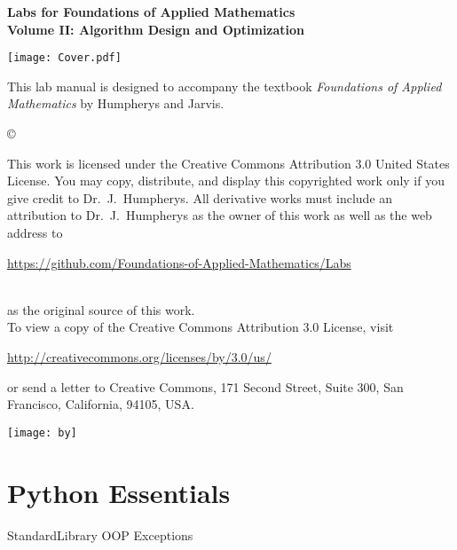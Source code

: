 \documentclass[nociteref]{SIAM-GH-book}
\begin{document}

\thispagestyle{empty} %

\begin{center}
{\huge \bf Labs for Foundations of Applied Mathematics} \\
\vspace{5mm}
{\Large \bf Volume II: Algorithm Design and Optimization}
\vspace{20mm}

\texttt{[image: Cover.pdf]}
\end{center}
\frontmatter



\begin{thepreface} %

This lab manual is designed to accompany the textbook \emph{Foundations of Applied Mathematics} by Humpherys and Jarvis.

\vfill
\copyright{This work is licensed under the Creative Commons Attribution 3.0 United States
License.  You may copy, distribute, and display this copyrighted work only if you give
credit to Dr.~J.~Humpherys. All derivative works must include an attribution to Dr.~J.~Humpherys as the owner of this work as well as the web address to
\\\centerline{\url{https://github.com/Foundations-of-Applied-Mathematics/Labs}}\\as the original source of this work.
\\To view a copy of the Creative Commons Attribution 3.0 License, visit
\\\centerline{\url{http://creativecommons.org/licenses/by/3.0/us/}} or send a letter to Creative Commons, 171 Second Street, Suite 300, San Francisco, California, 94105, USA.}

\vfill
\centering\texttt{[image: by]}
\vfill
\end{thepreface}

\setcounter{tocdepth}{1}
\tableofcontents

\mainmatter %

\part{Python Essentials} %
{StandardLibrary}
{OOP}
{Exceptions}
\end{document}
